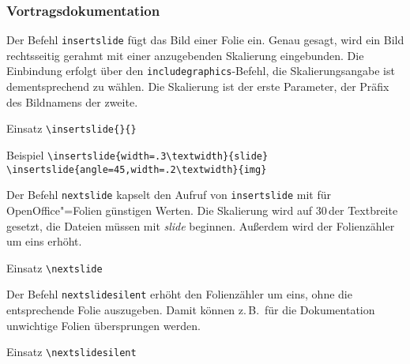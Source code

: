 \subsubsection{Vortragsdokumentation}
\label{sec:New:Vortragsdokumentation}

\DescribeMacro{\insertslide}
Der Befehl \verb#insertslide# fügt das Bild einer Folie ein.
Genau gesagt, wird ein Bild rechtsseitig gerahmt mit einer anzugebenden Skalierung eingebunden.
Die Einbindung erfolgt über den \verb#includegraphics#-Befehl, die Skalierungsangabe ist dementsprechend zu wählen.
Die Skalierung ist der erste Parameter, der Präfix des Bildnamens der zweite.

\begin{einspiel}{Einsatz}
 \>\verb#\insertslide{#\verb#}{#\verb#}#
\end{einspiel}
\begin{einspiel}{Beispiel}
 \>\verb#\insertslide{width=.3\textwidth}{slide}#\\
 \>\verb#\insertslide{angle=45,width=.2\textwidth}{img}#\\
\end{einspiel}

\DescribeMacro{\nextslide}
Der Befehl \verb#nextslide# kapselt den Aufruf von \verb#insertslide# mit für OpenOffice"=Folien günstigen Werten.
Die Skalierung wird auf 30\,der Textbreite gesetzt, die Dateien müssen mit \emph{slide} beginnen.
Außerdem wird der Folienzähler um eins erhöht.

\begin{einspiel}{Einsatz}
 \>\verb#\nextslide#
\end{einspiel}

\DescribeMacro{\nextslidesilent}
Der Befehl \verb#nextslidesilent# erhöht den Folienzähler um eins, ohne die entsprechende Folie auszugeben.
Damit können z.\,B.\ für die Dokumentation unwichtige Folien übersprungen werden.

\begin{einspiel}{Einsatz}
 \>\verb#\nextslidesilent#
\end{einspiel}


